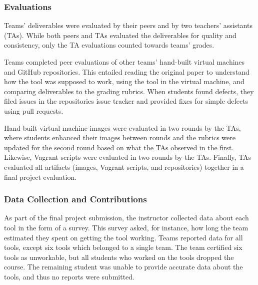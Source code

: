 \documentclass[10pt,conference]{IEEEtran}
\begin{document}
\subsubsection{Evaluations}

Teams' deliverables were evaluated by their 
peers and by two teachers' assistants (TAs).
While both peers and TAs evaluated the deliverables
for quality and consistency, only the TA evaluations
counted towards teams' grades.

Teams completed peer evaluations of other teams' hand-built 
virtual machines and GitHub repositories.
This entailed reading the original paper to understand
how the tool was supposed to work, 
using the tool in the virtual machine,
and comparing deliverables to the grading rubrics.
When students found defects, they filed issues 
in the repositories issue tracker and provided
fixes for simple defects using pull requests.


Hand-built virtual machine images were evaluated in 
two rounds by the TAs, where students enhanced their
images between rounds and the rubrics were updated
for the second round based on what the TAs 
observed in the first.
Likewise, Vagrant scripts were evaluated in two rounds
by the TAs.
Finally, TAs evaluated all artifacts (images, Vagrant 
scripts, and repositories) together in a final project 
evaluation.

\subsubsection{Data Collection and Contributions}

As part of the final project submission, 
the instructor collected data about 
each tool in the form of a survey.
This survey asked, for instance, how long
the team estimated they spent on getting 
the tool working.
Teams reported data for all tools, except six tools which belonged to a single team.
The team certified six tools as unworkable,
but all students who worked on the tools dropped
the course.
The remaining student was unable 
to provide accurate data about the tools, and thus 
no reports were submitted.
\end{document}
